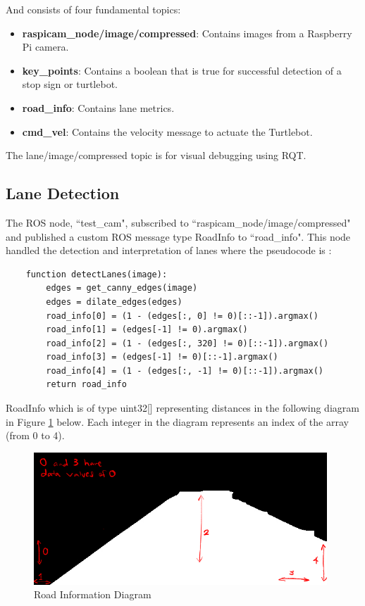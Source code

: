 \documentclass[11pt]{article}
\begin{document}
    And consists of four fundamental topics:
    \begin{itemize}[nolistsep, noitemsep]
        \item \textbf{raspicam\_node/image/compressed}: Contains images from a Raspberry Pi camera.
        \item \textbf{key\_points}: Contains a boolean that is true for successful detection of a stop sign or turtlebot.
        \item \textbf{road\_info}: Contains lane metrics.
        \item \textbf{cmd\_vel}: Contains the velocity message to actuate the Turtlebot.
    \end{itemize}

    The lane/image/compressed topic is for visual debugging using RQT.

    \subsection{Lane Detection}

    The ROS node, ``test\_cam", subscribed to ``raspicam\_node/image/compressed" and published a custom ROS message type RoadInfo to ``road\_info". This node handled the detection and interpretation of lanes where the pseudocode is \cite{lane_metrics}:

    \begin{verbatim}
    function detectLanes(image):
        edges = get_canny_edges(image)
        edges = dilate_edges(edges)
        road_info[0] = (1 - (edges[:, 0] != 0)[::-1]).argmax()
        road_info[1] = (edges[-1] != 0).argmax()
        road_info[2] = (1 - (edges[:, 320] != 0)[::-1]).argmax()
        road_info[3] = (edges[-1] != 0)[::-1].argmax()
        road_info[4] = (1 - (edges[:, -1] != 0)[::-1]).argmax()
        return road_info
    \end{verbatim}

    RoadInfo which is of type uint32[] representing distances in the following diagram in Figure \ref{fig:road_info_diagram} below. Each integer in the diagram represents an index of the array (from 0 to 4).

    \begin{figure}[h!]
        \centering
        \includegraphics[width=110mm]{images/road_info.png}
        \caption{Road Information Diagram}
        \label{fig:road_info_diagram}
    \end{figure}
\end{document}
